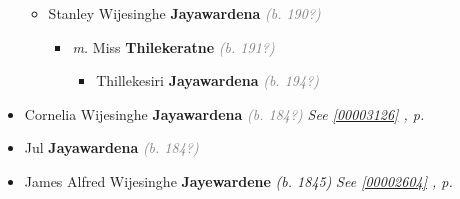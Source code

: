 \documentclass[10pt, openany]{book}
\begin{document}
\begin{itemize}
{\begin{itemize}
{\begin{itemize}
{\begin{itemize}
{\begin{itemize}
\item{Stanley Wijesinghe \textbf{Jayawardena} \textcolor{gray}{\textit{(b. 190?)}}
\begin{itemize}
\item{\textit{m.} Miss \textbf{Thilekeratne} \textcolor{gray}{\textit{(b. 191?)}}   \label{couple:00003032:00003033} \begin{itemize}
\item{Thillekesiri \textbf{Jayawardena} \textcolor{gray}{\textit{(b. 194?)}}
 }
\end{itemize}}
\end{itemize}
  }
\end{itemize}}
\end{itemize}
  }
\end{itemize}}
\end{itemize}
  }
\item{Cornelia Wijesinghe \textbf{Jayawardena} \textcolor{gray}{\textit{(b. 184?)}} \textcolor{slteal}{\textit{See  \autoref{00003126} \textit{, p. \pageref{00003126} }}}}
\item{Jul \textbf{Jayawardena} \textcolor{gray}{\textit{(b. 184?)}}
 }
\item{James Alfred Wijesinghe \textbf{Jayewardene} \textcolor{slorange}{\textit{(b. 1845)}} \textcolor{slteal}{\textit{See  \autoref{00002604} \textit{, p. \pageref{00002604} }}}}
\end{itemize}
   
\end{document}
